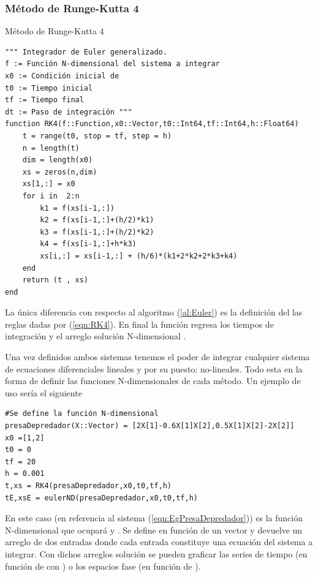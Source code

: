 \subsubsection{Método de Runge-Kutta 4}

\begin{algorithm}
	\caption{Método de Runge-Kutta 4}
	\label{al:RK4}
	\begin{verbatim}
""" Integrador de Euler generalizado.
f := Función N-dimensional del sistema a integrar
x0 := Condición inicial de
t0 := Tiempo inicial
tf := Tiempo final
dt := Paso de integración """
function RK4(f::Function,x0::Vector,t0::Int64,tf::Int64,h::Float64)          
	t = range(t0, stop = tf, step = h)
	n = length(t)
	dim = length(x0)
	xs = zeros(n,dim)
	xs[1,:] = x0
	for i in  2:n
		k1 = f(xs[i-1,:])
		k2 = f(xs[i-1,:]+(h/2)*k1)
		k3 = f(xs[i-1,:]+(h/2)*k2)
		k4 = f(xs[i-1,:]+h*k3)
		xs[i,:] = xs[i-1,:] + (h/6)*(k1+2*k2+2*k3+k4)
	end
	return (t , xs)
end
	\end{verbatim}
	La única diferencia con respecto al algoritmo (\ref{al:Euler}) es la definición del las reglas dadas por (\ref{eqn:RK4}). En final la función regresa los tiempos de integración  y el arreglo solución N-dimensional .
\end{algorithm}

Una vez definidos ambos sistemas tenemos el poder de integrar cualquier sistema de ecuaciones diferenciales lineales y por su puesto: no-lineales. Todo esta en la forma de definir las funciones  N-dimensionales de cada método. Un ejemplo de uso sería el siguiente
\begin{verbatim}
#Se define la función N-dimensional
presaDepredador(X::Vector) = [2X[1]-0.6X[1]X[2],0.5X[1]X[2]-2X[2]]
x0 =[1,2]
t0 = 0
tf = 20
h = 0.001
t,xs = RK4(presaDepredador,x0,t0,tf,h)
tE,xsE = eulerND(presaDepredador,x0,t0,tf,h)
\end{verbatim}
En este caso  (en referencia al sistema (\ref{eqn:EgPresaDepredador})) es la función N-dimensional que ocupará  y . Se define en función de un vector  y devuelve un arreglo de dos entradas donde cada entrada constituye una ecuación del sistema a integrar. Con dichos arreglos solución se pueden graficar las series de tiempo (en función de  con ) o los espacios fase (en función de ).